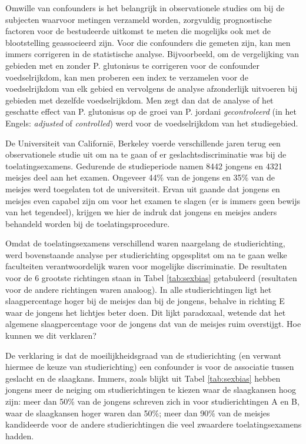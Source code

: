 \documentclass[12pt,dutch,coursenotes]{book}
\theoremstyle{definition}
\theoremstyle{definition}
\theoremstyle{definition}
\theoremstyle{remark}
\let\BeginKnitrBlock\begin \let\EndKnitrBlock\end
\begin{document}
Omwille van confounders is het belangrijk in observationele studies om
bij de subjecten waarvoor metingen verzameld worden, zorgvuldig
prognostische factoren voor de bestudeerde uitkomst te meten die
mogelijks ook met de blootstelling geassocieerd zijn. Voor die
confounders die gemeten zijn, kan men immers corrigeren in de
statistische analyse. Bijvoorbeeld, om de vergelijking van gebieden met
en zonder P. glutonisus te corrigeren voor de confounder voedselrijkdom,
kan men proberen een index te verzamelen voor de voedselrijkdom van elk
gebied en vervolgens de analyse afzonderlijk uitvoeren bij gebieden met
dezelfde voedselrijkdom. Men zegt dan dat de analyse of het geschatte
effect van P. glutonisus op de groei van P. jordani \emph{gecontroleerd}
(in het Engels: \emph{adjusted} of \emph{controlled}) werd voor de
voedselrijkdom van het studiegebied.

\BeginKnitrBlock{example}[Simpson's paradox]
\protect\hypertarget{exm:unnamed-chunk-28}{}{\label{exm:unnamed-chunk-28}
\iffalse (Simpson's paradox) \fi{} }
\EndKnitrBlock{example}

De Universiteit van Californië, Berkeley voerde verschillende jaren
terug een observationele studie uit om na te gaan of er
geslachtsdiscriminatie was bij de toelatingsexamens. Gedurende de
studieperiode namen 8442 jongens en 4321 meisjes deel aan het examen.
Ongeveer 44\% van de jongens en 35\% van de meisjes werd toegelaten tot
de universiteit. Ervan uit gaande dat jongens en meisjes even capabel
zijn om voor het examen te slagen (er is immers geen bewijs van het
tegendeel), krijgen we hier de indruk dat jongens en meisjes anders
behandeld worden bij de toelatingsprocedure.

Omdat de toelatingsexamens verschillend waren naargelang de
studierichting, werd bovenstaande analyse per studierichting opgesplitst
om na te gaan welke faculteiten verantwoordelijk waren voor mogelijke
discriminatie. De resultaten voor de 6 grootste richtingen staan in
Tabel \ref{tab:sexbias} getabuleerd (resultaten voor de andere
richtingen waren analoog). In alle studierichtingen ligt het
slaagpercentage hoger bij de meisjes dan bij de jongens, behalve in
richting E waar de jongens het lichtjes beter doen. Dit lijkt
paradoxaal, wetende dat het algemene slaagpercentage voor de jongens dat
van de meisjes ruim overstijgt. Hoe kunnen we dit verklaren?

De verklaring is dat de moeilijkheidsgraad van de studierichting (en
verwant hiermee de keuze van studierichting) een confounder is voor de
associatie tussen geslacht en de slaagkans. Immers, zoals blijkt uit
Tabel \ref{tab:sexbias} hebben jongens meer de neiging om
studierichtingen te kiezen waar de slaagkansen hoog zijn: meer dan 50\%
van de jongens schreven zich in voor studierichtingen A en B, waar de
slaagkansen hoger waren dan 50\%; meer dan 90\% van de meisjes
kandideerde voor de andere studierichtingen die veel zwaardere
toelatingsexamens hadden.
\end{document}
